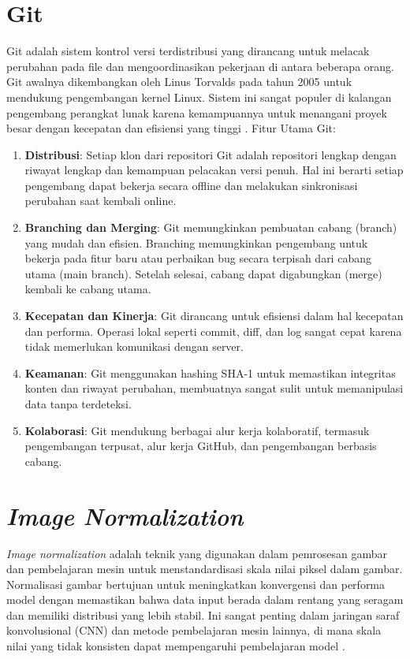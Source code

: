 \section{Git}
Git adalah sistem kontrol versi terdistribusi yang dirancang untuk melacak perubahan pada file dan mengoordinasikan pekerjaan di antara beberapa orang. Git awalnya dikembangkan oleh Linus Torvalds pada tahun 2005 untuk mendukung pengembangan kernel Linux. Sistem ini sangat populer di kalangan pengembang perangkat lunak karena kemampuannya untuk menangani proyek besar dengan kecepatan dan efisiensi yang tinggi \cite{Git2024}.
Fitur Utama Git:
\begin{enumerate}
    \item \textbf{Distribusi}: Setiap klon dari repositori Git adalah repositori lengkap dengan riwayat lengkap dan kemampuan pelacakan versi penuh. Hal ini berarti setiap pengembang dapat bekerja secara offline dan melakukan sinkronisasi perubahan saat kembali online.
    \item \textbf{Branching dan Merging}: Git memungkinkan pembuatan cabang (branch) yang mudah dan efisien. Branching memungkinkan pengembang untuk bekerja pada fitur baru atau perbaikan bug secara terpisah dari cabang utama (main branch). Setelah selesai, cabang dapat digabungkan (merge) kembali ke cabang utama.
    \item \textbf{Kecepatan dan Kinerja}: Git dirancang untuk efisiensi dalam hal kecepatan dan performa. Operasi lokal seperti commit, diff, dan log sangat cepat karena tidak memerlukan komunikasi dengan server.
    \item \textbf{Keamanan}: Git menggunakan hashing SHA-1 untuk memastikan integritas konten dan riwayat perubahan, membuatnya sangat sulit untuk memanipulasi data tanpa terdeteksi.
    \item \textbf{Kolaborasi}: Git mendukung berbagai alur kerja kolaboratif, termasuk pengembangan terpusat, alur kerja GitHub, dan pengembangan berbasis cabang.
\end{enumerate}

\section{\textit{Image Normalization}}
\textit{Image normalization} adalah teknik yang digunakan dalam pemrosesan gambar dan pembelajaran mesin untuk menstandardisasi skala nilai piksel dalam gambar. Normalisasi gambar bertujuan untuk meningkatkan konvergensi dan performa model dengan memastikan bahwa data input berada dalam rentang yang seragam dan memiliki distribusi yang lebih stabil. Ini sangat penting dalam jaringan saraf konvolusional (CNN) dan metode pembelajaran mesin lainnya, di mana skala nilai yang tidak konsisten dapat mempengaruhi pembelajaran model \cite{Goodfellow-et-al-2016}.

